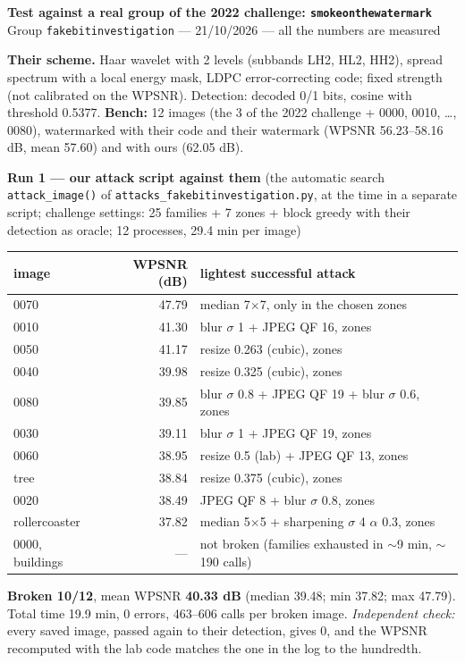 \documentclass[10pt,a4paper]{article}
\begin{document}
{\Large\bfseries Test against a real group of the 2022 challenge: \texttt{smokeonthewatermark}}\\[2pt]
{\small Group \texttt{fakebitinvestigation} — 21/10/2026 — all the numbers are measured}

\textbf{Their scheme.} Haar wavelet with 2 levels (subbands LH2, HL2, HH2), spread spectrum with a local energy mask, LDPC error-correcting code; fixed strength (not calibrated on the WPSNR). Detection: decoded 0/1 bits, cosine with threshold 0.5377. \textbf{Bench:} 12 images (the 3 of the 2022 challenge + 0000, 0010, \dots, 0080), watermarked with their code and their watermark (WPSNR 56.23–58.16 dB, mean 57.60) and with ours (62.05 dB).

\medskip
\textbf{Run 1 — our attack script against them} (the automatic search \texttt{attack\_image()} of \texttt{attacks\_fakebitinvestigation.py}, at the time in a separate script; challenge settings: 25 families + 7 zones + block greedy with their detection as oracle; 12 processes, 29.4 min per image)

\begin{tabularx}{\linewidth}{@{}l r X@{}}
\toprule
image & WPSNR (dB) & lightest successful attack \\
\midrule
0070 & 47.79 & median 7$\times$7, only in the chosen zones \\
0010 & 41.30 & blur $\sigma$ 1 + JPEG QF 16, zones \\
0050 & 41.17 & resize 0.263 (cubic), zones \\
0040 & 39.98 & resize 0.325 (cubic), zones \\
0080 & 39.85 & blur $\sigma$ 0.8 + JPEG QF 19 + blur $\sigma$ 0.6, zones \\
0030 & 39.11 & blur $\sigma$ 1 + JPEG QF 19, zones \\
0060 & 38.95 & resize 0.5 (lab) + JPEG QF 13, zones \\
tree & 38.84 & resize 0.375 (cubic), zones \\
0020 & 38.49 & JPEG QF 8 + blur $\sigma$ 0.8, zones \\
rollercoaster & 37.82 & median 5$\times$5 + sharpening $\sigma$ 4 $\alpha$ 0.3, zones \\
0000, buildings & — & \textcolor{ko}{not broken} (families exhausted in $\sim$9 min, $\sim$190 calls) \\
\bottomrule
\end{tabularx}

\textcolor{ok}{\textbf{Broken 10/12}}, mean WPSNR \textbf{40.33 dB} (median 39.48; min 37.82; max 47.79). Total time 19.9 min, 0 errors, 463–606 calls per broken image. \emph{Independent check:} every saved image, passed again to their detection, gives 0, and the WPSNR recomputed with the lab code matches the one in the log to the hundredth.
\end{document}
